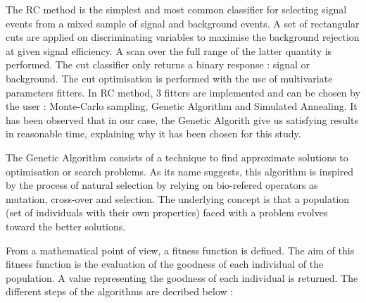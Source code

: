 \documentclass[main.tex]{subfiles}
\begin{document}
\bigskip


\NI The RC method is the simplest and most common classifier for selecting signal events from a mixed sample of signal and background events. A set of rectangular cuts are applied on discriminating variables to maximise the background rejection at given signal efficiency. A scan over the full range of the latter quantity is performed. The cut classifier only returns a binary response : signal or background. The cut optimisation is performed with the use of multivariate parameters fitters. In RC method, 3 fitters are implemented and can be chosen by the user : Monte-Carlo sampling, Genetic Algorithm and Simulated Annealing. It has been observed that in our case, the Genetic Algorith give us satisfying results in reasonable time, explaining why it has been chosen for this study.


\bigskip


\NI The Genetic Algorithm consists of a technique to find approximate solutions to optimisation or search problems. As its name suggests, this algorithm is inspired by the process of natural selection by relying on bio-refered operators as mutation, cross-over and selection. The underlying concept is that a population (set of individuals with their own properties) 
faced with a problem evolves toward the better solutions.


\bigskip


\NI From a mathematical point of view, a fitness function is defined. The aim of this fitness function is the evaluation of the goodness of each individual of the population. A value representing the goodness of each individual is returned. The different steps of the algorithms are decribed below : 
\end{document}
